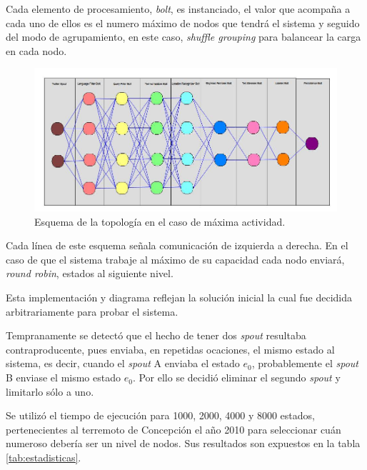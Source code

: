 Cada elemento de procesamiento, \textit{bolt}, es instanciado, el valor que acompaña a cada uno de ellos es el numero máximo de nodos que tendrá el sistema y seguido del modo de agrupamiento, en este caso, \textit{shuffle grouping} para balancear la carga en cada nodo.

\begin{figure}[H]
	\centering
	\captionsetup{justification=centering}
	\includegraphics[scale=0.5]{images/ImplementacionTopologia1.2.png}
	\caption[Esquema de la topología en el caso de máxima actividad.]{Esquema de la topología en el caso de máxima actividad.}
	\label{fig:Implementacion1p2}
\end{figure}

Cada línea de este esquema señala comunicación de izquierda a derecha. En el caso de que el sistema trabaje al máximo de su capacidad cada nodo enviará, \textit{round robin}, estados al siguiente nivel.

Esta implementación y diagrama reflejan la solución inicial la cual fue decidida arbitrariamente para probar el sistema.

Tempranamente se detectó que el hecho de tener dos \textit{spout} resultaba contraproducente, pues enviaba, en repetidas ocaciones, el mismo estado al sistema, es decir, cuando el \textit{spout} A enviaba el estado $e_{0}$, probablemente el \textit{spout} B enviase el mismo estado $e_{0}$. Por ello se decidió eliminar el segundo \textit{spout} y limitarlo sólo a uno.

Se utilizó el tiempo de ejecución para 1000, 2000, 4000 y 8000 estados, pertenecientes al terremoto de Concepción el año 2010 para seleccionar cuán numeroso debería ser un nivel de nodos. Sus resultados son expuestos en la tabla \ref{tab:estadisticas}.


